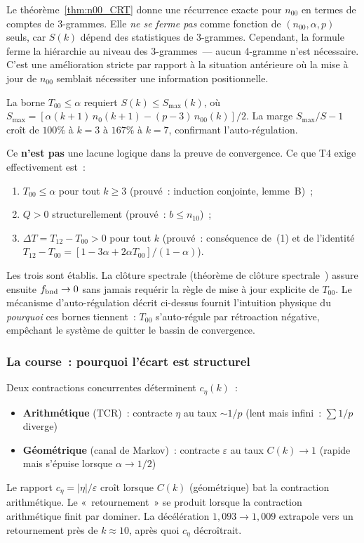 \documentclass[12pt,a4paper]{article}
\begin{document}
\begin{remarque}
\label{rem:T00_status}
Le théorème~\ref{thm:n00_CRT} donne une récurrence exacte pour
$n_{00}$ en termes de comptes de 3-grammes. Elle \emph{ne se ferme
pas} comme fonction de $(n_{00}, \alpha, p)$ seuls, car $S(k)$ dépend
des statistiques de 3-grammes. Cependant, la formule ferme la
hiérarchie au niveau des 3-grammes~--- aucun 4-gramme n'est
nécessaire. C'est une amélioration stricte par rapport à la situation
antérieure où la mise à jour de $n_{00}$ semblait nécessiter une
information positionnelle.

La borne $T_{00} \leq \alpha$ requiert $S(k) \leq S_{\max}(k)$, où
$S_{\max} = [\alpha(k{+}1)\,n_0(k{+}1) - (p{-}3)\,n_{00}(k)]/2$. La
marge $S_{\max}/S - 1$ croît de $100\%$ à $k = 3$ à $167\%$ à
$k = 7$, confirmant l'auto-régulation.

Ce \textbf{n'est pas} une lacune logique dans la preuve de
convergence. Ce que T4 exige effectivement est~:
\begin{enumerate}[nosep]
\item $T_{00} \leq \alpha$ pour tout $k \geq 3$
  (prouvé~: induction conjointe, lemme~B)~;
\item $Q > 0$ structurellement
  (prouvé~: $b \leq n_{10}$)~;
\item $\Delta T = T_{12} - T_{00} > 0$ pour tout $k$
  (prouvé~: conséquence de~(1) et de l'identité
  $T_{12} - T_{00} = [1 - 3\alpha + 2\alpha T_{00}]/(1-\alpha)$).
\end{enumerate}
Les trois sont établis. La clôture spectrale (théorème de clôture
spectrale~\cite{companion_M3}) assure ensuite $f_{\rm bnd} \to 0$
sans jamais requérir la règle de mise à jour explicite de $T_{00}$.
Le mécanisme d'auto-régulation décrit ci-dessus fournit l'intuition
physique du \emph{pourquoi} ces bornes tiennent~: $T_{00}$
s'auto-régule par rétroaction négative, empêchant le système de
quitter le bassin de convergence.
\end{remarque}

\subsubsection{La course~: pourquoi l'écart est structurel}

Deux contractions concurrentes déterminent $c_\eta(k)$~:
\begin{itemize}[nosep]
\item \textbf{Arithmétique} (TCR)~: contracte $\eta$ au taux
  $\sim 1/p$ (lent mais infini~: $\sum 1/p$ diverge)
\item \textbf{Géométrique} (canal de Markov)~: contracte
  $\varepsilon$ au taux $C(k) \to 1$ (rapide mais s'épuise lorsque
  $\alpha \to 1/2$)
\end{itemize}
Le rapport $c_\eta = |\eta|/\varepsilon$ croît lorsque $C(k)$
(géométrique) bat la contraction arithmétique. Le
«~retournement~» se produit lorsque la contraction arithmétique
finit par dominer. La décélération
$1{,}093 \to 1{,}009$ extrapole vers un retournement près de
$k \approx 10$, après quoi $c_\eta$ décroîtrait.
\end{document}
